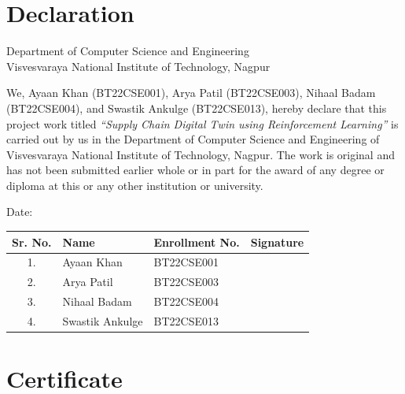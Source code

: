 \chapter*{Declaration}

\noindent Department of Computer Science and Engineering\\
Visvesvaraya National Institute of Technology, Nagpur

\vspace{1cm}

\noindent We, Ayaan Khan (BT22CSE001), Arya Patil (BT22CSE003), Nihaal Badam (BT22CSE004), and Swastik Ankulge (BT22CSE013), hereby declare that this project work titled \textit{``Supply Chain Digital Twin using Reinforcement Learning''} is carried out by us in the Department of Computer Science and Engineering of Visvesvaraya National Institute of Technology, Nagpur. The work is original and has not been submitted earlier whole or in part for the award of any degree or diploma at this or any other institution or university.

\vspace{1.5cm}

\noindent Date:

\vspace{1cm}

\begin{tabular}{|c|l|l|c|}
\hline
\textbf{Sr. No.} & \textbf{Name} & \textbf{Enrollment No.} & \textbf{Signature} \\
\hline
1. & Ayaan Khan        & BT22CSE001 & \\[0.5cm]
\hline
2. & Arya Patil        & BT22CSE003 & \\[0.5cm]
\hline
3. & Nihaal Badam      & BT22CSE004 & \\[0.5cm]
\hline
4. & Swastik Ankulge   & BT22CSE013 & \\[0.5cm]
\hline
\end{tabular}

\newpage

\chapter*{Certificate}

